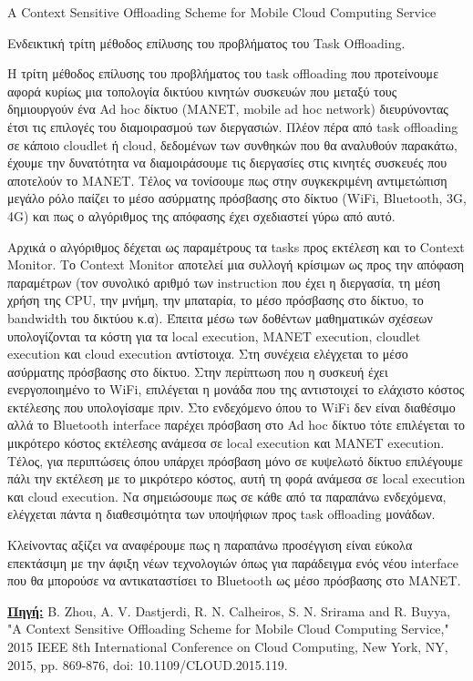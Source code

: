 \documentclass{article}
\begin{document}
\newpage

\Huge{A Context Sensitive Offloading Scheme for Mobile Cloud Computing Service}
\par
\vspace{0.5cm}
\huge{Ενδεικτική τρίτη μέθοδος επίλυσης του προβλήματος του Task Offloading.}
\par
\vspace{0.4cm}
\large{Η τρίτη μέθοδος επίλυσης του προβλήματος του task offloading που προτείνουμε αφορά κυρίως μια τοπολογία δικτύου κινητών συσκευών που μεταξύ τους δημιουργούν ένα Ad hoc δίκτυο (MANET, mobile ad hoc network) διευρύνοντας έτσι τις επιλογές του διαμοιρασμού των διεργασιών. Πλέον πέρα από task offloading σε κάποιο cloudlet ή cloud, δεδομένων των συνθηκών που θα αναλυθούν παρακάτω, έχουμε την δυνατότητα να διαμοιράσουμε τις διεργασίες στις κινητές συσκευές που αποτελούν το MANET. Τέλος να τονίσουμε πως στην συγκεκριμένη αντιμετώπιση μεγάλο ρόλο παίζει το μέσο ασύρματης πρόσβασης στο δίκτυο (WiFi, Bluetooth, 3G, 4G) και πως ο αλγόριθμος της απόφασης έχει σχεδιαστεί γύρω από αυτό.
}
\par
\vspace{0.4cm}
\large{
Αρχικά ο αλγόριθμος δέχεται ως παραμέτρους τα tasks προς εκτέλεση και το Context Monitor. Το Context Monitor αποτελεί μια συλλογή κρίσιμων ως προς την απόφαση παραμέτρων (τον συνολικό αριθμό των instruction που έχει η διεργασία, τη μέση χρήση της CPU, την μνήμη, την μπαταρία, το μέσο πρόσβασης στο δίκτυο, το bandwidth του δικτύου κ.α). Έπειτα μέσω των δοθέντων μαθηματικών σχέσεων υπολογίζονται τα κόστη για τα local execution, MANET execution, cloudlet execution και cloud execution αντίστοιχα. Στη συνέχεια ελέγχεται το μέσο ασύρματης πρόσβασης στο δίκτυο. Στην περίπτωση που η συσκευή έχει ενεργοποιημένο το WiFi, επιλέγεται η μονάδα που της αντιστοιχεί το ελάχιστο κόστος εκτέλεσης που υπολογίσαμε πριν. Στο ενδεχόμενο όπου το WiFi δεν είναι διαθέσιμο αλλά το Bluetooth interface παρέχει πρόσβαση στο Ad hoc δίκτυο τότε επιλέγεται το μικρότερο κόστος εκτέλεσης ανάμεσα σε local execution και MANET execution. Τέλος, για περιπτώσεις όπου υπάρχει πρόσβαση μόνο σε κυψελωτό δίκτυο επιλέγουμε πάλι την εκτέλεση με το μικρότερο κόστος, αυτή τη φορά ανάμεσα σε local execution και cloud execution. Να σημειώσουμε πως σε κάθε από τα παραπάνω ενδεχόμενα, ελέγχεται πάντα η διαθεσιμότητα των υποψήφιων προς task offloading μονάδων.      
}

\par
\vspace{0.4cm}
\large{
Κλείνοντας αξίζει να αναφέρουμε πως η παραπάνω προσέγγιση είναι εύκολα επεκτάσιμη με την άφιξη νέων τεχνολογιών όπως για παράδειγμα ενός νέου interface που θα μπορούσε να αντικαταστίσει το Bluetooth ως μέσο πρόσβασης στο MANET.      
}

\par
\vspace{0.5cm}
\large{
\href{https://ieeexplore.ieee.org/abstract/document/7214129}{\textbf{Πηγή:}} B. Zhou, A. V. Dastjerdi, R. N. Calheiros, S. N. Srirama and R. Buyya, "A Context Sensitive Offloading Scheme for Mobile Cloud Computing Service," 2015 IEEE 8th International Conference on Cloud Computing, New York, NY, 2015, pp. 869-876, doi: 10.1109/CLOUD.2015.119.      
}
\end{document}
